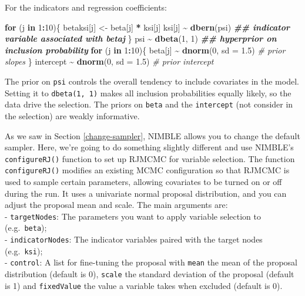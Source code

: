 \documentclass[
  12pt,
]{krantz}
\newenvironment{Shaded}{\begin{snugshade}}{\end{snugshade}}
\newcommand{\AttributeTok}[1]{\textcolor[rgb]{0.13,0.29,0.53}{#1}}
\newcommand{\CommentTok}[1]{\textcolor[rgb]{0.56,0.35,0.01}{\textit{#1}}}
\newcommand{\ControlFlowTok}[1]{\textcolor[rgb]{0.13,0.29,0.53}{\textbf{#1}}}
\newcommand{\DecValTok}[1]{\textcolor[rgb]{0.00,0.00,0.81}{#1}}
\newcommand{\DocumentationTok}[1]{\textcolor[rgb]{0.56,0.35,0.01}{\textbf{\textit{#1}}}}
\newcommand{\FloatTok}[1]{\textcolor[rgb]{0.00,0.00,0.81}{#1}}
\newcommand{\FunctionTok}[1]{\textcolor[rgb]{0.13,0.29,0.53}{\textbf{#1}}}
\newcommand{\NormalTok}[1]{#1}
\newcommand{\OtherTok}[1]{\textcolor[rgb]{0.56,0.35,0.01}{#1}}
\newcommand{\SpecialCharTok}[1]{\textcolor[rgb]{0.81,0.36,0.00}{\textbf{#1}}}
\begin{document}
For the indicators and regression coefficients:

\begin{Shaded}
\begin{Highlighting}[]
\ControlFlowTok{for}\NormalTok{ (j }\ControlFlowTok{in} \DecValTok{1}\SpecialCharTok{:}\DecValTok{10}\NormalTok{)\{}
\NormalTok{  betaksi[j] }\OtherTok{\textless{}{-}}\NormalTok{ beta[j] }\SpecialCharTok{*}\NormalTok{ ksi[j]}
\NormalTok{  ksi[j] }\SpecialCharTok{\textasciitilde{}} \FunctionTok{dbern}\NormalTok{(psi) }\DocumentationTok{\#\# indicator variable associated with betaj}
\NormalTok{\}}
\NormalTok{psi }\SpecialCharTok{\textasciitilde{}} \FunctionTok{dbeta}\NormalTok{(}\DecValTok{1}\NormalTok{, }\DecValTok{1}\NormalTok{) }\DocumentationTok{\#\# hyperprior on inclusion probability}
\ControlFlowTok{for}\NormalTok{ (j }\ControlFlowTok{in} \DecValTok{1}\SpecialCharTok{:}\DecValTok{10}\NormalTok{)\{}
\NormalTok{  beta[j] }\SpecialCharTok{\textasciitilde{}} \FunctionTok{dnorm}\NormalTok{(}\DecValTok{0}\NormalTok{, }\AttributeTok{sd =} \FloatTok{1.5}\NormalTok{) }\CommentTok{\# prior slopes}
\NormalTok{\}}
\NormalTok{intercept }\SpecialCharTok{\textasciitilde{}} \FunctionTok{dnorm}\NormalTok{(}\DecValTok{0}\NormalTok{, }\AttributeTok{sd =} \FloatTok{1.5}\NormalTok{) }\CommentTok{\# prior intercept}
\end{Highlighting}
\end{Shaded}

The prior on \texttt{psi} controls the overall tendency to include covariates in the model. Setting it to \texttt{dbeta(1,\ 1)} makes all inclusion probabilities equally likely, so the data drive the selection. The priors on \texttt{beta} and the \texttt{intercept} (not consider in the selection) are weakly informative.

As we saw in Section \ref{change-sampler}, NIMBLE allows you to change the default sampler. Here, we're going to do something slightly different and use NIMBLE's \texttt{configureRJ()} function to set up RJMCMC for variable selection. The function \texttt{configureRJ()} modifies an existing MCMC configuration so that RJMCMC is used to sample certain parameters, allowing covariates to be turned on or off during the run. It uses a univariate normal proposal distribution, and you can adjust the proposal mean and scale. The main arguments are:\\
- \texttt{targetNodes}: The parameters you want to apply variable selection to (e.g.~\texttt{beta});\\
- \texttt{indicatorNodes}: The indicator variables paired with the target nodes (e.g.~\texttt{ksi});\\
- \texttt{control}: A list for fine-tuning the proposal with \texttt{mean} the mean of the proposal distribution (default is 0), \texttt{scale} the standard deviation of the proposal (default is 1) and \texttt{fixedValue} the value a variable takes when excluded (default is 0).
\end{document}
